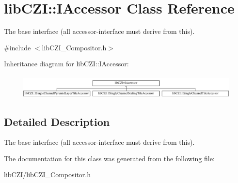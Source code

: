 \hypertarget{classlib_c_z_i_1_1_i_accessor}{}\section{lib\+C\+ZI\+:\+:I\+Accessor Class Reference}
\label{classlib_c_z_i_1_1_i_accessor}


The base interface (all accessor-\/interface must derive from this).  




{\ttfamily \#include $<$lib\+C\+Z\+I\+\_\+\+Compositor.\+h$>$}

Inheritance diagram for lib\+C\+ZI\+:\+:I\+Accessor\+:\begin{figure}[H]
\begin{center}
\leavevmode
\includegraphics[height=1.252796cm]{classlib_c_z_i_1_1_i_accessor}
\end{center}
\end{figure}


\subsection{Detailed Description}
The base interface (all accessor-\/interface must derive from this). 

The documentation for this class was generated from the following file\+:\begin{DoxyCompactItemize}
\item 
lib\+C\+Z\+I/lib\+C\+Z\+I\+\_\+\+Compositor.\+h\end{DoxyCompactItemize}
